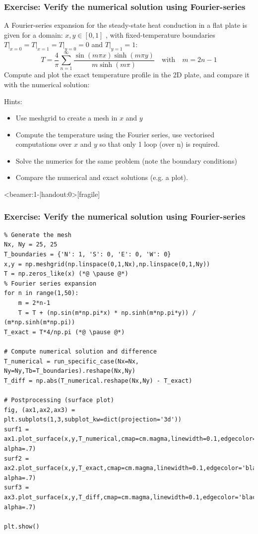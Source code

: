 {\nologo
\begin{frame}[fragile]
  \frametitle{Exercise: Verify the numerical solution using Fourier-series}
  A Fourier-series expansion for the steady-state heat conduction in a flat plate is given for a domain: $x,y\in[0,1]$ , with fixed-temperature boundaries $T\big|_{x=0} = T\big|_{x=1} = T\big|_{y=0}=0$ and $T\big|_{y=1}=1$:
\[
    T = \frac{4}{\pi} \sum_{n=1}^\infty \frac{\sin\left(m \pi x \right)\sinh\left(m\pi y \right)}{m \sinh\left(m \pi \right)} \quad \text{with} \quad m=2n-1
\]
Compute and plot the exact temperature profile in the 2D plate, and compare it with the numerical solution:
  \begin{hints}
  Hints:
  \begin{itemize}
      \item Use meshgrid to create a mesh in $x$ and $y$
      \item Compute the temperature using the Fourier series, use vectorised computations over $x$ and $y$ so that only 1 loop (over n) is required.
      \item Solve the numerics for the same problem (note the boundary conditions)
      \item Compare the numerical and exact solutions (e.g. a plot).
  \end{itemize}
  \end{hints}
\end{frame}
}

\begin{frame}<beamer:1-|handout:0>[fragile]
  \frametitle{Exercise: Verify the numerical solution using Fourier-series}
    \begin{lstlisting}
% Generate the mesh
Nx, Ny = 25, 25
T_boundaries = {'N': 1, 'S': 0, 'E': 0, 'W': 0}
x,y = np.meshgrid(np.linspace(0,1,Nx),np.linspace(0,1,Ny))
T = np.zeros_like(x) (*@ \pause @*)
% Fourier series expansion
for n in range(1,50):
    m = 2*n-1
    T = T + (np.sin(m*np.pi*x) * np.sinh(m*np.pi*y)) / (m*np.sinh(m*np.pi))
T_exact = T*4/np.pi (*@ \pause @*)

# Compute numerical solution and difference
T_numerical = run_specific_case(Nx=Nx, Ny=Ny,Tb=T_boundaries).reshape(Nx,Ny)
T_diff = np.abs(T_numerical.reshape(Nx,Ny) - T_exact)

# Postprocessing (surface plot)
fig, (ax1,ax2,ax3) = plt.subplots(1,3,subplot_kw=dict(projection='3d'))
surf1 = ax1.plot_surface(x,y,T_numerical,cmap=cm.magma,linewidth=0.1,edgecolor='black', alpha=.7)
surf2 = ax2.plot_surface(x,y,T_exact,cmap=cm.magma,linewidth=0.1,edgecolor='black', alpha=.7)
surf3 = ax3.plot_surface(x,y,T_diff,cmap=cm.magma,linewidth=0.1,edgecolor='black', alpha=.7)

plt.show()
    \end{lstlisting}
\end{frame}


